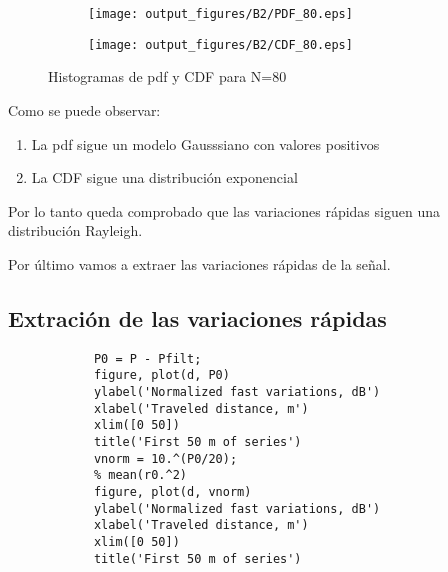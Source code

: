 \documentclass{article}
\begin{document}
             \begin{figure}[h]
                \centering
                \begin{subfigure}
                    \centering          \texttt{[image: output\_figures/B2/PDF\_80.eps]}
               \end{subfigure}
               \begin{subfigure}
                    \centering          \texttt{[image: output\_figures/B2/CDF\_80.eps]}
               \end{subfigure}    
               \caption{Histogramas de pdf y CDF para N=80}
                \label{fig:sup_rugosas}
            \end{figure}
            \par Como se puede observar:
             \begin{enumerate}
                 \item La pdf sigue un modelo Gausssiano con valores positivos 
                 \item La CDF sigue una distribución exponencial
             \end{enumerate}
            \par Por lo tanto queda comprobado que las variaciones rápidas siguen una distribución Rayleigh.
            \par Por último vamos a extraer las variaciones rápidas de la señal.
    \clearpage
    \subsection{Extración de las variaciones rápidas}
        \begin{lstlisting}
            P0 = P - Pfilt;
            figure, plot(d, P0)
            ylabel('Normalized fast variations, dB')
            xlabel('Traveled distance, m')
            xlim([0 50])
            title('First 50 m of series')
            vnorm = 10.^(P0/20);
            % mean(r0.^2)   
            figure, plot(d, vnorm)
            ylabel('Normalized fast variations, dB')
            xlabel('Traveled distance, m')
            xlim([0 50])
            title('First 50 m of series')
        \end{lstlisting}
            
\end{document}

